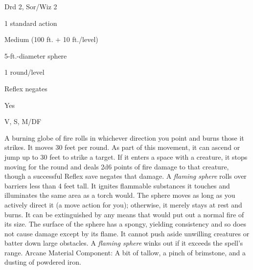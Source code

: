 
\begin{description*}
\item[Level:] Drd 2, Sor/Wiz 2
\item[Casting Time:] 1 standard action
\item[Range:] Medium (100 ft. + 10 ft./level)
\item[Effect:] 5-ft.-diameter sphere
\item[Duration:] 1 round/level
\item[Saving Throw:] Reflex negates
\item[Spell Resistance:] Yes
\item[Components:] V, S, M/DF
\end{description*}

A burning globe of fire rolls in whichever direction you point and burns those
it strikes. It moves 30 feet per round. As part of this movement, it can ascend
or jump up to 30 feet to strike a target. If it enters a space with a creature,
it stops moving for the round and deals 2d6 points of fire damage to that creature,
though a successful Reflex save negates that damage. A \textit{flaming sphere} rolls
over barriers less than 4 feet tall. It ignites flammable substances it touches
and illuminates the same area as a torch would.
The sphere moves as long as you actively direct it (a move action for you); otherwise,
it merely stays at rest and burns. It can be extinguished by any means that would
put out a normal fire of its size. The surface of the sphere has a spongy, yielding
consistency and so does not cause damage except by its flame. It cannot push aside
unwilling creatures or batter down large obstacles. A \textit{flaming sphere} winks
out if it exceeds the spell's range.
Arcane Material Component: A bit of tallow, a pinch of brimstone, and
a dusting of powdered iron.